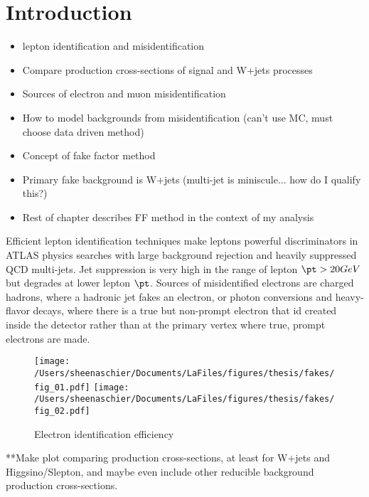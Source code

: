 \section{Introduction}
\begin{itemize}
\item lepton identification and misidentification
\item Compare production cross-sections of signal and W+jets processes
\item Sources of electron and muon misidentification
\item How to model backgrounds from misidentification (can't use MC, must choose data driven method)
\item Concept of fake factor method
\item Primary fake background is W+jets (multi-jet is miniscule...  how do I qualify this?)
\item Rest of chapter describes FF method in the context of my analysis
\end{itemize}
Efficient lepton identification techniques make leptons powerful discriminators in ATLAS physics searches with large background rejection and heavily suppressed QCD multi-jets.  Jet suppression is very high in the range of lepton $\pt > 20 GeV$ but degrades at lower lepton $\pt$.  Sources of misidentified electrons are charged hadrons, where a hadronic jet fakes an electron, or photon conversions and heavy-flavor decays, where there is a true but non-prompt electron that id created inside the detector rather than at the primary vertex where true, prompt electrons are made.  
\begin{figure}[h!]
 \centering
 \texttt{[image: /Users/sheenaschier/Documents/LaFiles/figures/thesis/fakes/fig\_01.pdf]}
  \texttt{[image: /Users/sheenaschier/Documents/LaFiles/figures/thesis/fakes/fig\_02.pdf]}
 \caption{Electron identification efficiency}
 \label{fig:electronID}
 \end{figure}

**Make plot comparing production cross-sections, at least for W+jets and Higgsino/Slepton, and maybe even include other reducible background production cross-sections.
 \FloatBarrier
 
